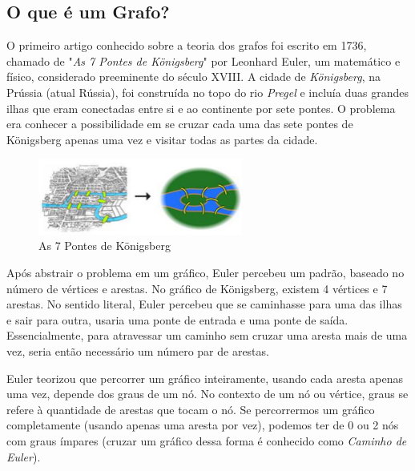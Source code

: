 \documentclass[a4paper,11pt]{article}
\begin{document}
\subsection{O que é um Grafo?}
O primeiro artigo conhecido sobre a teoria dos grafos foi escrito em 1736, chamado de "\textit{As 7 Pontes de Königsberg}" por Leonhard Euler, um matemático e físico, considerado preeminente do século XVIII. A cidade de \textit{Königsberg}, na Prússia (atual Rússia), foi construída no topo do rio \textit{Pregel} e incluía duas grandes ilhas que eram conectadas entre si e ao continente por sete pontes. O problema era conhecer a possibilidade em se cruzar cada uma das sete pontes de Königsberg apenas uma vez e visitar todas as partes da cidade.
\begin{figure}[H]
	\centering
	\includegraphics[width=0.6\textwidth]{imagens/pontes}
	\caption{As 7 Pontes de Königsberg}
\end{figure}

Após abstrair o problema em um gráfico, Euler percebeu um padrão, baseado no número de vértices e arestas. No gráfico de Königsberg, existem 4 vértices e 7 arestas. No sentido literal, Euler percebeu que se caminhasse para uma das ilhas e sair para outra, usaria uma ponte de entrada e uma ponte de saída. Essencialmente, para atravessar um caminho sem cruzar uma aresta mais de uma vez, seria então necessário um número par de arestas.

Euler teorizou que percorrer um gráfico inteiramente, usando cada aresta apenas uma vez, depende dos graus de um nó. No contexto de um nó ou vértice, graus se refere à quantidade de arestas que tocam o nó. Se percorrermos um gráfico completamente (usando apenas uma aresta por vez), podemos ter de 0 ou 2 nós com graus ímpares (cruzar um gráfico dessa forma é conhecido como \textit{Caminho de Euler}). 
\end{document}
